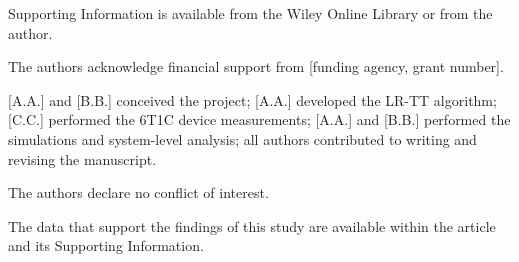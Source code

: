 \documentclass[AMA,LATO2COL]{WileyNJDv5}
\begin{document}
Supporting Information is available from the Wiley Online Library or from the author.

The authors acknowledge financial support from [funding agency, grant number].

[A.A.] and [B.B.] conceived the project; [A.A.] developed the LR-TT algorithm; [C.C.] performed the 6T1C device measurements; [A.A.] and [B.B.] performed the simulations and system-level analysis; all authors contributed to writing and revising the manuscript.

The authors declare no conflict of interest.

The data that support the findings of this study are available within the article and its Supporting Information.
%


\end{document}
